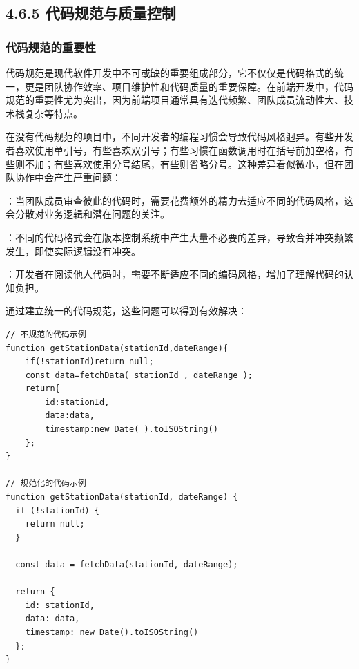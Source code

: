 \hypertarget{ux4ee3ux7801ux89c4ux8303ux4e0eux8d28ux91cfux63a7ux5236}{%
\subsection{4.6.5 代码规范与质量控制}\label{ux4ee3ux7801ux89c4ux8303ux4e0eux8d28ux91cfux63a7ux5236}}

\hypertarget{ux4ee3ux7801ux89c4ux8303ux7684ux91cdux8981ux6027}{%
\subsubsection{代码规范的重要性}\label{ux4ee3ux7801ux89c4ux8303ux7684ux91cdux8981ux6027}}

代码规范是现代软件开发中不可或缺的重要组成部分，它不仅仅是代码格式的统一，更是团队协作效率、项目维护性和代码质量的重要保障。在前端开发中，代码规范的重要性尤为突出，因为前端项目通常具有迭代频繁、团队成员流动性大、技术栈复杂等特点。


在没有代码规范的项目中，不同开发者的编程习惯会导致代码风格迥异。有些开发者喜欢使用单引号，有些喜欢双引号；有些习惯在函数调用时在括号前加空格，有些则不加；有些喜欢使用分号结尾，有些则省略分号。这种差异看似微小，但在团队协作中会产生严重问题：

：当团队成员审查彼此的代码时，需要花费额外的精力去适应不同的代码风格，这会分散对业务逻辑和潜在问题的关注。

：不同的代码格式会在版本控制系统中产生大量不必要的差异，导致合并冲突频繁发生，即使实际逻辑没有冲突。

：开发者在阅读他人代码时，需要不断适应不同的编码风格，增加了理解代码的认知负担。

通过建立统一的代码规范，这些问题可以得到有效解决：

\begin{lstlisting}[style=javascript]
// 不规范的代码示例
function getStationData(stationId,dateRange){
    if(!stationId)return null;
    const data=fetchData( stationId , dateRange );
    return{
        id:stationId,
        data:data,
        timestamp:new Date( ).toISOString()
    };
}

// 规范化的代码示例
function getStationData(stationId, dateRange) {
  if (!stationId) {
    return null;
  }
  
  const data = fetchData(stationId, dateRange);
  
  return {
    id: stationId,
    data: data,
    timestamp: new Date().toISOString()
  };
}
\end{lstlisting}

